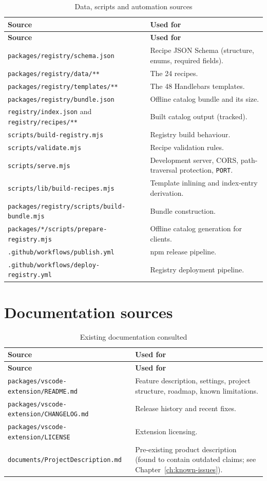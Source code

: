 \begin{longtable}{@{}L{6.2cm}L{8cm}@{}}
\caption{Data, scripts and automation sources}\\
\toprule
\textbf{Source} & \textbf{Used for} \\
\midrule
\endfirsthead
\toprule
\textbf{Source} & \textbf{Used for} \\
\midrule
\endhead
\texttt{packages/registry/schema.json} & Recipe JSON Schema (structure, enums,
required fields). \\
\texttt{packages/registry/data/**} & The 24 recipes. \\
\texttt{packages/registry/templates/**} & The 48 Handlebars templates. \\
\texttt{packages/registry/bundle.json} & Offline catalog bundle and its size. \\
\texttt{registry/index.json} and \texttt{registry/recipes/**} & Built catalog
output (tracked). \\
\texttt{scripts/build-registry.mjs} & Registry build behaviour. \\
\texttt{scripts/validate.mjs} & Recipe validation rules. \\
\texttt{scripts/serve.mjs} & Development server, CORS, path-traversal protection,
\texttt{PORT}. \\
\texttt{scripts/lib/build-recipes.mjs} & Template inlining and index-entry
derivation. \\
\texttt{packages/registry/scripts/build-bundle.mjs} & Bundle construction. \\
\texttt{packages/*/scripts/prepare-registry.mjs} & Offline catalog generation for
clients. \\
\texttt{.github/workflows/publish.yml} & npm release pipeline. \\
\texttt{.github/workflows/deploy-registry.yml} & Registry deployment pipeline. \\
\bottomrule
\end{longtable}

\section{Documentation sources}

\begin{longtable}{@{}L{6.2cm}L{8cm}@{}}
\caption{Existing documentation consulted}\\
\toprule
\textbf{Source} & \textbf{Used for} \\
\midrule
\endfirsthead
\toprule
\textbf{Source} & \textbf{Used for} \\
\midrule
\endhead
\texttt{packages/vscode-extension/README.md} & Feature description, settings,
project structure, roadmap, known limitations. \\
\texttt{packages/vscode-extension/CHANGELOG.md} & Release history and recent
fixes. \\
\texttt{packages/vscode-extension/LICENSE} & Extension licensing. \\
\texttt{documents/ProjectDescription.md} & Pre-existing product description
(found to contain outdated claims; see Chapter~\ref{ch:known-issues}). \\
\bottomrule
\end{longtable}

